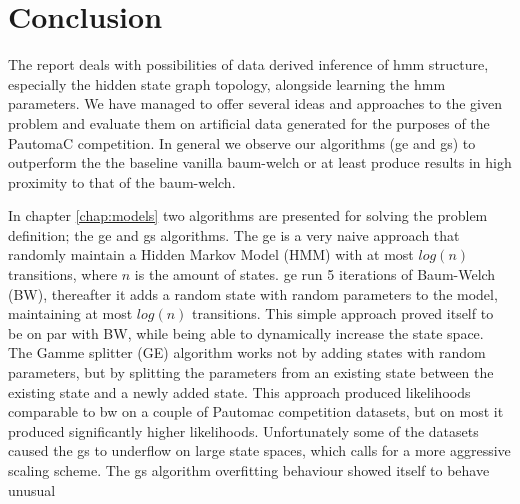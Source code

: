 \chapter{Conclusion}
\label{chap:conclusion}
The report deals with possibilities of data derived inference of \gls{hmm} structure, especially the hidden state graph topology, alongside learning the \gls{hmm} parameters. We have managed to offer several ideas and approaches to the given problem and evaluate them on artificial data generated for the purposes of the PautomaC competition. In general we observe our algorithms (\acrfull{ge} and \acrfull{gs}) to outperform the the baseline vanilla \gls{baum-welch} or at least produce results in high proximity to that of the \gls{baum-welch}.

In chapter \ref{chap:models} two algorithms are presented for solving the problem definition; the \acrfull{ge} and \acrfull{gs} algorithms. The \gls{ge} is a very naive approach that randomly maintain a Hidden Markov Model (HMM) with at most $log(n)$ transitions, where $n$ is the amount of states. \gls{ge} run 5 iterations of Baum-Welch (BW), thereafter it adds a random state with random parameters to the model, maintaining at most $log(n)$ transitions. This simple approach proved itself to be on par with BW, while being able to dynamically increase the state space. The Gamme splitter (GE) algorithm works not by adding states with random parameters, but by splitting the parameters from an existing state between the existing state and a newly added state. This approach produced likelihoods comparable to \gls{bw} on a couple of Pautomac competition datasets, but on most it produced significantly higher likelihoods. Unfortunately some of the datasets caused the \gls{gs} to underflow on large state spaces, which calls for a more aggressive scaling scheme.
The \gls{gs} algorithm overfitting behaviour showed itself to behave unusual
